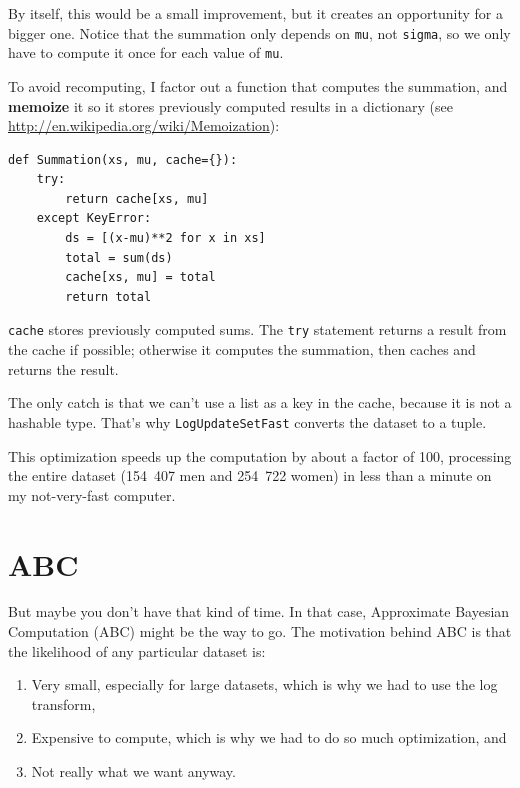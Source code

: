 \documentclass[12pt]{book}
\begin{document}
By itself, this would be a small improvement, but it
creates an opportunity for a bigger one.  Notice that the
summation only depends on {\tt mu}, not {\tt sigma}, so we only
have to compute it once for each value of {\tt mu}.

To avoid recomputing, I factor out a function that computes the
summation, and {\bf memoize} it so it stores previously computed
results in a dictionary (see
\url{http://en.wikipedia.org/wiki/Memoization}): 

\begin{verbatim}
def Summation(xs, mu, cache={}):
    try:
        return cache[xs, mu]
    except KeyError:
        ds = [(x-mu)**2 for x in xs]
        total = sum(ds)
        cache[xs, mu] = total
        return total
\end{verbatim}

{\tt cache} stores previously computed sums.  The {\tt try} statement
returns a result from the cache if possible; otherwise it computes
the summation, then caches and returns the result.

The only catch is that we can't use a list as a key in the cache, because
it is not a hashable type.  That's why {\tt LogUpdateSetFast} converts
the dataset to a tuple.

This optimization speeds up the computation by about a
factor of 100, processing the entire dataset (154~407 men and 254~722
women) in less than a minute on my not-very-fast computer.


\section{ABC}

But maybe you don't have that kind of time.  In that case, Approximate
Bayesian Computation (ABC) might be the way to go.  The motivation
behind ABC is that the likelihood of any particular dataset is:

\begin{enumerate}

\item Very small, especially for large datasets, which is why we had
to use the log transform,

\item Expensive to compute, which is why we had to do so much
optimization, and

\item Not really what we want anyway.

\end{enumerate}
\end{document}
